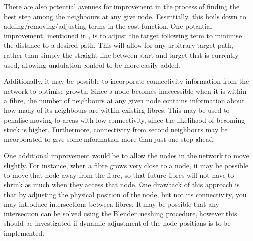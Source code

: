 There are also potential avenues for improvement in the process of finding the best step among the neighbours at any give node.
Essentially, this boils down to adding/removing/adjusting terms in the cost function.
One potential improvement, mentioned in , is to adjust the target following term to minimise the distance to a desired path.
This will allow for any arbitrary target path, rather than simply the straight line between start and target that is currently used, allowing undulation control to be more easily added.

Additionally, it may be possible to incorporate connectivity information from the network to optimise growth.
Since a node becomes inaccessible when it is within a fibre, the number of neighbours at any given node contains information about how many of its neighbours are within existing fibres.
This may be used to penalise moving to areas with low connectivity, since the likelihood of becoming stuck is higher.
Furthermore, connectivity from second neighbours may be incorporated to give some information more than just one step ahead. 

One additional improvement would be to allow the nodes in the network to move slightly.
For instance, when a fibre grows very close to a node, it may be possible to move that node away from the fibre, so that future fibres will not have to shrink as much when they access that node.
One drawback of this approach is that by adjusting the physical position of the node, but not its connectivity, you may introduce intersections between fibres.
It may be possible that any intersection can be solved using the Blender meshing procedure, however this should be investigated if dynamic adjustment of the node positions is to be implemented. 

